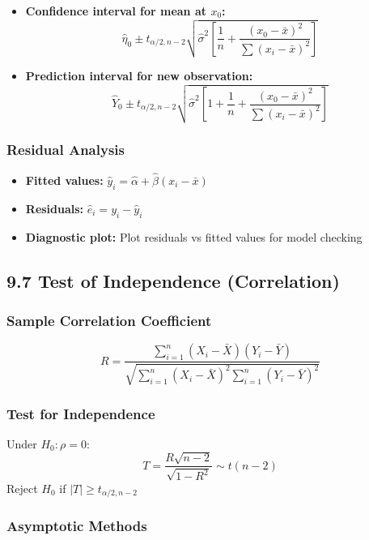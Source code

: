 \begin{itemize}
	\item \textbf{Confidence interval for mean at $x_0$:}
\[
\hat{\eta}_0 \pm t_{\alpha/2,n-2} \sqrt{\hat{\sigma}^2\left[\frac{1}{n} + \frac{(x_0-\bar{x})^2}{\sum(x_i-\bar{x})^2}\right]}
\]
	\item \textbf{Prediction interval for new observation:}
\[
\hat{Y}_0 \pm t_{\alpha/2,n-2} \sqrt{\hat{\sigma}^2\left[1 + \frac{1}{n} + \frac{(x_0-\bar{x})^2}{\sum(x_i-\bar{x})^2}\right]}
\]
\end{itemize}

\subsubsection{Residual Analysis}

\begin{itemize}
	\item \textbf{Fitted values:} $\hat{y}_i = \hat{\alpha} + \hat{\beta}(x_i - \bar{x})$
	\item \textbf{Residuals:} $\hat{e}_i = y_i - \hat{y}_i$
	\item \textbf{Diagnostic plot:} Plot residuals vs fitted values for model checking
\end{itemize}

\subsection{9.7 Test of Independence (Correlation)}

\subsubsection{Sample Correlation Coefficient}
\[
R = \frac{\sum_{i=1}^n (X_i - \bar{X})(Y_i - \bar{Y})}{\sqrt{\sum_{i=1}^n (X_i - \bar{X})^2 \sum_{i=1}^n (Y_i - \bar{Y})^2}}
\]

\subsubsection{Test for Independence}

\begin{theorem}[\textbf{Test for $\rho = 0$}]
Under $H_0: \rho = 0$:
\[
T = \frac{R\sqrt{n-2}}{\sqrt{1-R^2}} \sim t(n-2)
\]
Reject $H_0$ if $|T| \geq t_{\alpha/2, n-2}$
\end{theorem}
\subsubsection{Asymptotic Methods}

